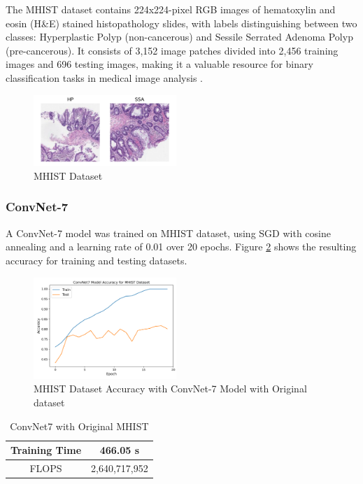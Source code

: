 \documentclass[conference, compsoc]{IEEEtran}
\begin{document}
	The MHIST dataset contains 224x224-pixel RGB images of hematoxylin and eosin (H\&E) stained histopathology slides, with labels distinguishing between two classes: Hyperplastic Polyp (non-cancerous) and Sessile Serrated Adenoma Polyp (pre-cancerous). It consists of 3,152 image patches divided into 2,456 training images and 696 testing images, making it a valuable resource for binary classification tasks in medical image analysis \cite{wei2021petri}.
	\begin{figure}[H]
		\centering
		\includegraphics[width=0.48\textwidth]{MHIST_dataset.png}
		\caption{MHIST Dataset \cite{wei2021petri}}
		\label{fig:mhist_dataset}
	\end{figure}
	\subsubsection{ConvNet-7} \hfill
	
	A ConvNet-7 model was trained on MHIST dataset, using SGD with cosine annealing and a learning rate of 0.01 over 20 epochs. Figure \ref{fig:mhist_convnet7_acc} shows the resulting accuracy for training and testing datasets.
	\begin{figure}[H]
		\centering
		\includegraphics[width=0.48\textwidth]{mhist_convnet7_acc.png}
		\caption{MHIST Dataset Accuracy with ConvNet-7 Model with Original dataset}
		\label{fig:mhist_convnet7_acc}
	\end{figure}
	
	\begin{table}[H]
		\caption{ConvNet7 with Original MHIST}
		\centering
		\label{tab:convet7_results}
		\begin{tabular}{|c|c|}
			\hline
			Training Time & 466.05 s\\
			\hline
			FLOPS & 2,640,717,952 \\
			\hline
		\end{tabular}
	\end{table}
	
\end{document}
